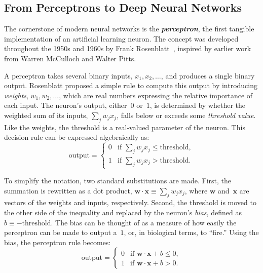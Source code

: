 \subsection{From Perceptrons to Deep Neural Networks}
\label{sec:artificial-neural-networks}

The cornerstone of modern neural networks is the \emph{\textbf{perceptron}}, the first
tangible implementation of an artificial learning neuron.
The concept was developed throughout the 1950s and 1960s by Frank
Rosenblatt~\cite{perceptron}, inspired by earlier work from Warren McCulloch
and Walter Pitts. 

A perceptron takes several binary inputs, $x_1, x_2, \dots$, and produces a
single binary output.
Rosenblatt proposed a simple rule to compute this output by introducing
\textit{weights}, $w_1, w_2, \dots$, which are real numbers expressing the
relative importance of each input.
The neuron's output, either~$0$ or~$1$, is determined by whether the weighted
sum of its inputs, $\sum_j w_j x_j$, falls below or exceeds some
\textit{threshold value}.
Like the weights, the threshold is a real-valued parameter of the neuron.
This decision rule can be expressed algebraically as:
\begin{equation}
\label{eq:perceptron-threshold}
\text{output} = 
\begin{cases} 
0 & \text{if } \sum_j w_j x_j \le \text{threshold}, \\ 
1 & \text{if } \sum_j w_j x_j > \text{threshold}. 
\end{cases}
\end{equation}

To simplify the notation, two standard substitutions are made.
First, the summation is rewritten as a dot product,
$\mathbf{w} \cdot \mathbf{x} \equiv \sum_j w_j x_j$, where $\mathbf{w}$
and~$\mathbf{x}$ are vectors of the weights and inputs, respectively.
Second, the threshold is moved to the other side of the inequality and
replaced by the neuron's \textit{bias}, defined as
$b \equiv -\text{threshold}$.
The bias can be thought of as a measure of how easily the perceptron can be
made to output a~$1$, or, in biological terms, to ``fire.''
Using the bias, the perceptron rule becomes:
\begin{equation}
\label{eq:perceptron-bias}
\text{output} = 
\begin{cases} 
0 & \text{if } \mathbf{w} \cdot \mathbf{x} + b \le 0, \\ 
1 & \text{if } \mathbf{w} \cdot \mathbf{x} + b > 0. 
\end{cases}
\end{equation}

